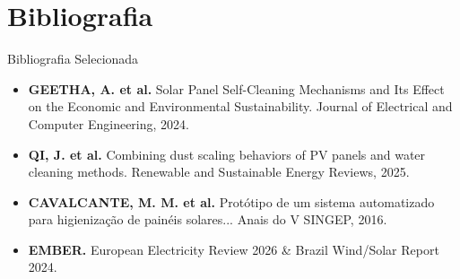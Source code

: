 \documentclass[aspectratio=169, xcolor={table}]{beamer}
\begin{document}
\section{Bibliografia}
\begin{frame}{Bibliografia Selecionada}
    \footnotesize
    \begin{itemize}
        \item \textbf{GEETHA, A. et al.} Solar Panel Self-Cleaning Mechanisms and Its Effect on the Economic and Environmental Sustainability. Journal of Electrical and Computer Engineering, 2024.
        \item \textbf{QI, J. et al.} Combining dust scaling behaviors of PV panels and water cleaning methods. Renewable and Sustainable Energy Reviews, 2025.
        \item \textbf{CAVALCANTE, M. M. et al.} Protótipo de um sistema automatizado para higienização de painéis solares... Anais do V SINGEP, 2016.
        \item \textbf{EMBER.} European Electricity Review 2026 \& Brazil Wind/Solar Report 2024.
    \end{itemize}
\end{frame}
\end{document}
